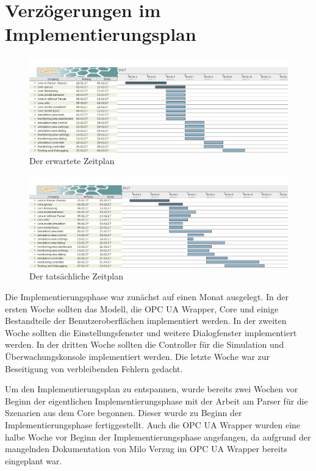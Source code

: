 \documentclass[parskip=full]{scrartcl}
\begin{document}
\section{Verzögerungen im Implementierungsplan}
\begin{figure}[H]
	\centering
	\includegraphics[scale=0.35]{media/GanttDiagram/pseGantt.png}
	\caption{Der erwartete Zeitplan}
\end{figure}

\begin{figure}[H]
	\centering
	\includegraphics[scale=0.35]{media/GanttDiagram/pseGanttReal.png}
	\caption{Der tatsächliche Zeitplan}
\end{figure}

Die Implementierungsphase war zunächst auf einen Monat ausgelegt.
In der ersten Woche sollten das Modell, die OPC UA Wrapper, Core und einige Bestandteile der Benutzeroberflächen
implementiert werden.
In der zweiten Woche sollten die Einstellungsfenster und weitere Dialogfenster implementiert werden.
In der dritten Woche sollten die Controller für die Simulation und Überwachungskonsole implementiert werden.
Die letzte Woche war zur Beseitigung von verbleibenden Fehlern gedacht.

Um den Implementierungsplan zu entspannen, wurde bereits zwei Wochen vor Beginn der eigentlichen Implementierungsphase
mit der Arbeit am Parser für die Szenarien aus dem Core begonnen. Dieser wurde zu Beginn der Implementierungsphase fertiggestellt.
Auch die OPC UA Wrapper wurden eine halbe Woche vor Beginn der Implementierungsphase angefangen, da aufgrund der mangelnden Dokumentation von Milo Verzug im OPC UA Wrapper bereits eingeplant war.
\end{document}
